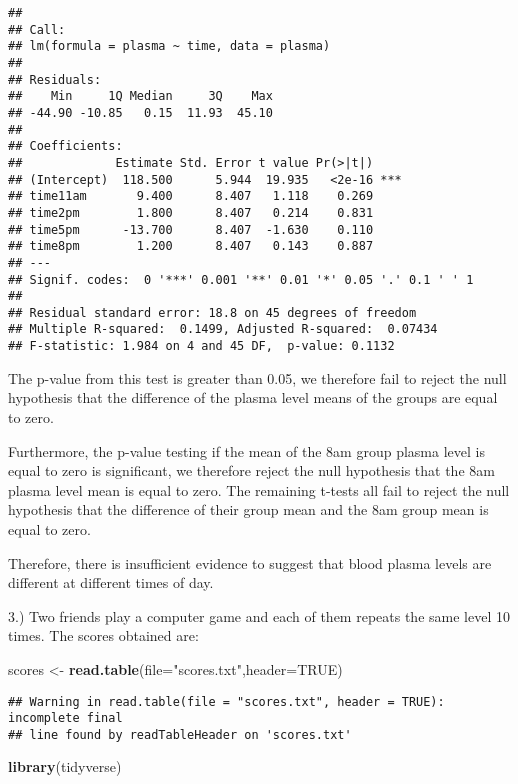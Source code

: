 \documentclass[
]{article}
\newenvironment{Shaded}{\begin{snugshade}}{\end{snugshade}}
\newcommand{\AttributeTok}[1]{\textcolor[rgb]{0.13,0.29,0.53}{#1}}
\newcommand{\ConstantTok}[1]{\textcolor[rgb]{0.56,0.35,0.01}{#1}}
\newcommand{\FunctionTok}[1]{\textcolor[rgb]{0.13,0.29,0.53}{\textbf{#1}}}
\newcommand{\NormalTok}[1]{#1}
\newcommand{\OtherTok}[1]{\textcolor[rgb]{0.56,0.35,0.01}{#1}}
\newcommand{\StringTok}[1]{\textcolor[rgb]{0.31,0.60,0.02}{#1}}
\begin{document}
\begin{verbatim}
## 
## Call:
## lm(formula = plasma ~ time, data = plasma)
## 
## Residuals:
##    Min     1Q Median     3Q    Max 
## -44.90 -10.85   0.15  11.93  45.10 
## 
## Coefficients:
##             Estimate Std. Error t value Pr(>|t|)    
## (Intercept)  118.500      5.944  19.935   <2e-16 ***
## time11am       9.400      8.407   1.118    0.269    
## time2pm        1.800      8.407   0.214    0.831    
## time5pm      -13.700      8.407  -1.630    0.110    
## time8pm        1.200      8.407   0.143    0.887    
## ---
## Signif. codes:  0 '***' 0.001 '**' 0.01 '*' 0.05 '.' 0.1 ' ' 1
## 
## Residual standard error: 18.8 on 45 degrees of freedom
## Multiple R-squared:  0.1499, Adjusted R-squared:  0.07434 
## F-statistic: 1.984 on 4 and 45 DF,  p-value: 0.1132
\end{verbatim}

The p-value from this test is greater than 0.05, we therefore fail to
reject the null hypothesis that the difference of the plasma level means
of the groups are equal to zero.

Furthermore, the p-value testing if the mean of the 8am group plasma
level is equal to zero is significant, we therefore reject the null
hypothesis that the 8am plasma level mean is equal to zero. The
remaining t-tests all fail to reject the null hypothesis that the
difference of their group mean and the 8am group mean is equal to zero.

Therefore, there is insufficient evidence to suggest that blood plasma
levels are different at different times of day.

3.) Two friends play a computer game and each of them repeats the same
level 10 times. The scores obtained are:

\begin{Shaded}
\begin{Highlighting}[]
\NormalTok{scores }\OtherTok{\textless{}{-}} \FunctionTok{read.table}\NormalTok{(}\AttributeTok{file=}\StringTok{"scores.txt"}\NormalTok{,}\AttributeTok{header=}\ConstantTok{TRUE}\NormalTok{)}
\end{Highlighting}
\end{Shaded}

\begin{verbatim}
## Warning in read.table(file = "scores.txt", header = TRUE): incomplete final
## line found by readTableHeader on 'scores.txt'
\end{verbatim}

\begin{Shaded}
\begin{Highlighting}[]
\FunctionTok{library}\NormalTok{(tidyverse)}
\end{Highlighting}
\end{Shaded}
\end{document}
